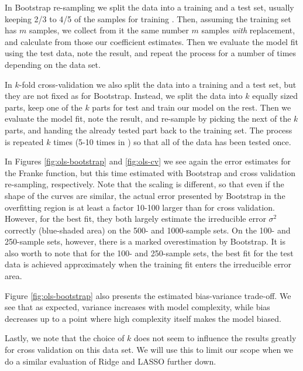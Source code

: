 \documentclass[]{article}
\begin{document}
In Bootstrap re-sampling we split the data into a training and a test set, usually keeping 2/3 to 4/5 of the samples for training \cite{assignment}. Then, assuming the training set has $m$ samples, we collect from it the same number $m$ samples \textit{with} replacement, and calculate from those our coefficient estimates. Then we evaluate the model fit using the test data, note the result, and repeat the process for a number of times depending on the data set.

In $k$-fold cross-validation we also split the data into a training and a test set, but they are not fixed as for Bootstrap. Instead, we split the data into $k$ equally sized parts, keep one of the $k$ parts for test and train our model on the rest. Then we evaluate the model fit, note the result, and re-sample by picking the next of the $k$ parts, and handing the already tested part back to the training set. The process is repeated $k$ times (5-10 times in \cite{assignment}) so that all of the data has been tested once.

In Figures \ref{fig:ols-bootstrap} and \ref{fig:ols-cv} we see again the error estimates for the Franke function, but this time estimated with Bootstrap and cross validation re-sampling, respectively. Note that the scaling is different, so that even if the shape of the curves are similar, the actual error presented by Bootstrap in the overfitting region is at least a factor 10-100 larger than for cross validation. However, for the best fit, they both largely estimate the irreducible error $\sigma^2$ correctly (blue-shaded area) on the 500- and 1000-sample sets. On the 100- and 250-sample sets, however, there is a marked overestimation by Bootstrap. It is also worth to note that for the 100- and 250-sample sets, the best fit for the test data is achieved approximately when the training fit enters the irreducible error area.

Figure \ref{fig:ols-bootstrap} also presents the estimated bias-variance trade-off. We see that as expected, variance increases with model complexity, while bias decreases up to a point where high complexity itself makes the model biased.

Lastly, we note that the choice of $k$ does not seem to influence the results greatly for cross validation on this data set. We will use this to limit our scope when we do a similar evaluation of Ridge and LASSO further down.
\end{document}
